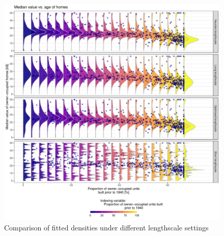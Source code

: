 \documentclass[
]{article}
\begin{document}
\begin{figure}[H]

{\centering \includegraphics{IntroductionSLGP_files/figure-latex/plotRibbonsLen1-1} 

}

\caption{Comparison of fitted densities under different lengthscale settings}\label{fig:plotRibbonsLen1}
\end{figure}
\end{document}
